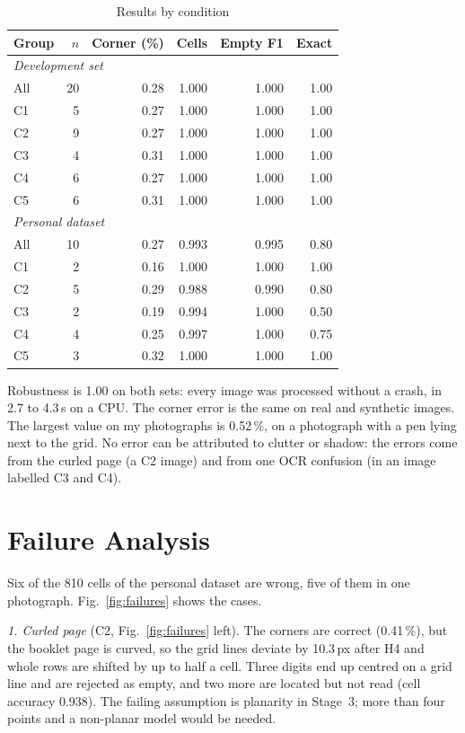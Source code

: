 \documentclass[conference]{IEEEtran}
\begin{document}
\begin{table}[t]
\caption{Results by condition}
\label{tab:results}
\centering
\begin{tabular}{lrrrrr}
\toprule
Group & $n$ & Corner (\%) & Cells & Empty F1 & Exact\\
\midrule
\multicolumn{6}{l}{\emph{Development set}}\\
All & 20 & 0.28 & 1.000 & 1.000 & 1.00\\
C1  & 5  & 0.27 & 1.000 & 1.000 & 1.00\\
C2  & 9  & 0.27 & 1.000 & 1.000 & 1.00\\
C3  & 4  & 0.31 & 1.000 & 1.000 & 1.00\\
C4  & 6  & 0.27 & 1.000 & 1.000 & 1.00\\
C5  & 6  & 0.31 & 1.000 & 1.000 & 1.00\\
\midrule
\multicolumn{6}{l}{\emph{Personal dataset}}\\
All & 10 & 0.27 & 0.993 & 0.995 & 0.80\\
C1  & 2  & 0.16 & 1.000 & 1.000 & 1.00\\
C2  & 5  & 0.29 & 0.988 & 0.990 & 0.80\\
C3  & 2  & 0.19 & 0.994 & 1.000 & 0.50\\
C4  & 4  & 0.25 & 0.997 & 1.000 & 0.75\\
C5  & 3  & 0.32 & 1.000 & 1.000 & 1.00\\
\bottomrule
\end{tabular}
\end{table}

Robustness is 1.00 on both sets: every image was processed without a crash,
in 2.7 to 4.3\,s on a CPU. The corner error is the same on real and
synthetic images. The largest value on my photographs is 0.52\,\%, on a
photograph with a pen lying next to the grid. No error can be attributed to clutter or
shadow: the errors come from the curled page (a C2 image) and from one OCR
confusion (in an image labelled C3 and C4).

\section{Failure Analysis}
\label{sec:failures}
Six of the 810 cells of the personal dataset are wrong, five of them in
one photograph. Fig.~\ref{fig:failures} shows the cases.


\emph{1. Curled page} (C2, Fig.~\ref{fig:failures} left). The corners are
correct (0.41\,\%), but the booklet page is curved, so the grid lines
deviate by 10.3\,px after H4 and whole rows are shifted by up to half a
cell. Three digits end up centred on a grid line and are rejected as empty, and
two more are located but not read (cell accuracy 0.938). The failing assumption is
planarity in Stage~3; more than four points and a non-planar model would be
needed.
\end{document}
